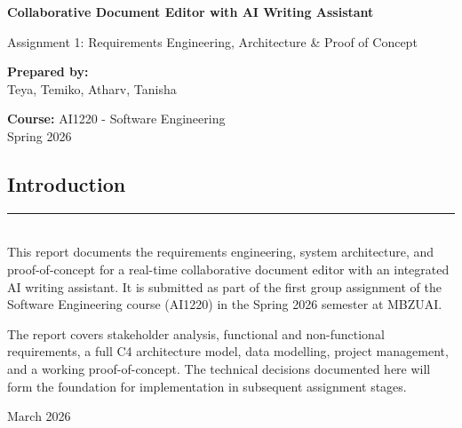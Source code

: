 \documentclass{article}
\begin{document}
\begin{titlepage}
    \centering
    \vspace*{1cm}
    
    {\large \textbf{Collaborative Document Editor with AI Writing Assistant} \par}
    \vspace{1cm}
    {\Large Assignment 1: Requirements Engineering, Architecture \& Proof of Concept \par}
    
    \vspace{1.5cm}
    
    {\large \textbf{Prepared by:} \\ Teya, Temiko, Atharv, Tanisha\par}
    \vspace{1cm}
    {\large \textbf{Course:} AI1220 - Software Engineering \\ Spring 2026 \par}
    
    \vfill %

    \begin{flushleft}
    \section*{Introduction}
    \rule{\textwidth}{0.4pt} \\ [2ex]
    This report documents the requirements engineering, system architecture, and proof-of-concept for a real-time collaborative document editor with an integrated AI writing assistant. It is submitted as part of the first group assignment of the Software Engineering course (AI1220) in the Spring 2026 semester at MBZUAI. 
    \medskip
    
    The report covers stakeholder analysis, functional and non-functional requirements, a full C4 architecture model, data modelling, project management, and a working proof-of-concept. The technical decisions documented here will form the foundation for implementation in subsequent assignment stages.
    \end{flushleft}

    \vfill
    {\large March 2026 \par}
    \vspace*{1cm}
\end{titlepage}
\end{document}
